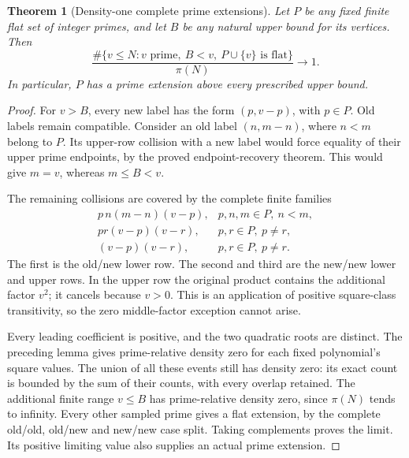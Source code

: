 \documentclass[11pt]{article}
\newtheorem{theorem}{Theorem}[section]
\begin{document}
\begin{theorem}[Density-one complete prime extensions]
\label{thm:native-prime-vertex-extension}
Let \(P\) be any fixed finite flat set of integer primes, and let \(B\)
be any natural upper bound for its vertices. Then
\[
 \boxed{\quad
 \frac{\#\{v\le N:v\text{ prime},\ B<v,\
                   P\cup\{v\}\text{ is flat}\}}{\pi(N)}
       \longrightarrow1.\quad}
\]
In particular, \(P\) has a prime extension above every prescribed
upper bound.
\end{theorem}
\begin{proof}
For \(v>B\), every new label has the form \((p,v-p)\), with \(p\in P\).
Old labels remain compatible. Consider an old label \((n,m-n)\),
where \(n<m\) belong to \(P\). Its upper-row collision with a new
label would force equality of their upper prime endpoints, by the
proved endpoint-recovery theorem. This would give \(m=v\), whereas
\(m\le B<v\).

The remaining collisions are covered by the complete finite families
\[
 \begin{array}{ll}
 p\,n(m-n)(v-p),&
          p,n,m\in P,\ n<m,\\[2pt]
 pr(v-p)(v-r),&
          p,r\in P,\ p\ne r,\\[2pt]
 (v-p)(v-r),&
          p,r\in P,\ p\ne r.
 \end{array}
\]
The first is the old/new lower row. The second and third are the
new/new lower and upper rows. In the upper row the original product
contains the additional factor \(v^2\); it cancels because \(v>0\).
This is an application of positive square-class transitivity, so
the zero middle-factor exception cannot arise.

Every leading coefficient is positive, and the two quadratic roots
are distinct. The preceding lemma gives prime-relative density zero
for each fixed polynomial's square values. The union of all these
events still has density zero: its exact count is bounded by the
sum of their counts, with every overlap retained. The additional
finite range \(v\le B\) has prime-relative density zero, since
\(\pi(N)\) tends to infinity. Every other sampled prime gives a flat
extension, by the complete old/old, old/new and new/new case split.
Taking complements proves the limit. Its positive limiting value
also supplies an actual prime extension.
\end{proof}
\end{document}
